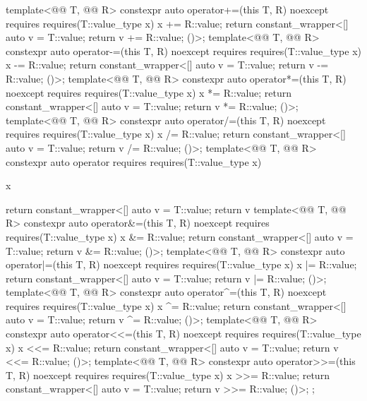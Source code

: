 \begin{codeblock}
{  template<@@ T, @@ R>
    constexpr auto operator+=(this T, R) noexcept
      requires requires(T::value_type x) { x += R::value; }
        { return constant_wrapper<[] { auto v = T::value; return v += R::value; }()>{}; }
  template<@@ T, @@ R>
    constexpr auto operator-=(this T, R) noexcept
      requires requires(T::value_type x) { x -= R::value; }
        { return constant_wrapper<[] { auto v = T::value; return v -= R::value; }()>{}; }
  template<@@ T, @@ R>
    constexpr auto operator*=(this T, R) noexcept
      requires requires(T::value_type x) { x *= R::value; }
        { return constant_wrapper<[] { auto v = T::value; return v *= R::value; }()>{}; }
  template<@@ T, @@ R>
    constexpr auto operator/=(this T, R) noexcept
      requires requires(T::value_type x) { x /= R::value; }
        { return constant_wrapper<[] { auto v = T::value; return v /= R::value; }()>{}; }
  template<@@ T, @@ R>
    constexpr auto operator%
      requires requires(T::value_type x) { x %
        { return constant_wrapper<[] { auto v = T::value; return v %
  template<@@ T, @@ R>
    constexpr auto operator&=(this T, R) noexcept
      requires requires(T::value_type x) { x &= R::value; }
        { return constant_wrapper<[] { auto v = T::value; return v &= R::value; }()>{}; }
  template<@@ T, @@ R>
    constexpr auto operator|=(this T, R) noexcept
      requires requires(T::value_type x) { x |= R::value; }
        { return constant_wrapper<[] { auto v = T::value; return v |= R::value; }()>{}; }
  template<@@ T, @@ R>
    constexpr auto operator^=(this T, R) noexcept
      requires requires(T::value_type x) { x ^= R::value; }
        { return constant_wrapper<[] { auto v = T::value; return v ^= R::value; }()>{}; }
  template<@@ T, @@ R>
    constexpr auto operator<<=(this T, R) noexcept
      requires requires(T::value_type x) { x <<= R::value; }
        { return constant_wrapper<[] { auto v = T::value; return v <<= R::value; }()>{}; }
  template<@@ T, @@ R>
    constexpr auto operator>>=(this T, R) noexcept
      requires requires(T::value_type x) { x >>= R::value; }
        { return constant_wrapper<[] { auto v = T::value; return v >>= R::value; }()>{}; }
};

}}}
\end{codeblock}
